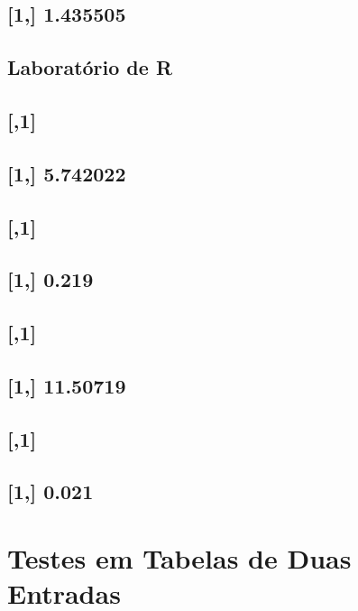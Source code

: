 \documentclass[]{book}
\theoremstyle{definition}
\theoremstyle{definition}
\theoremstyle{definition}
\theoremstyle{remark}
\begin{document}
\section{{[}1,{]} 1.435505}\label{section-45}

\section{Laboratório de R}\label{laboratorio-de-r-4}

\section{{[},1{]}}\label{section-46}

\section{{[}1,{]} 5.742022}\label{section-47}

\section{{[},1{]}}\label{section-48}

\section{{[}1,{]} 0.219}\label{section-49}

\section{{[},1{]}}\label{section-50}

\section{{[}1,{]} 11.50719}\label{section-51}

\section{{[},1{]}}\label{section-52}

\section{{[}1,{]} 0.021}\label{section-53}

\chapter{Testes em Tabelas de Duas Entradas}\label{testetab2}
\end{document}
